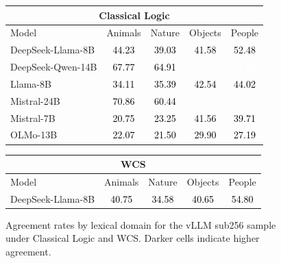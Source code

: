 \begin{figure}[H]
\centering
\caption{Agreement rates by lexical domain for the vLLM sub256 sample under Classical Logic and WCS. Darker cells indicate higher agreement.}
\label{fig:domain-heatmap-vllm}
\small
\begin{tabular}{lcccc}
\multicolumn{5}{c}{\textbf{Classical Logic}} \\
\toprule
Model & Animals & Nature & Objects & People \\
\midrule
DeepSeek-Llama-8B & \cellcolor[HTML]{A9C4B0}\textcolor{black}{44.23} & \cellcolor[HTML]{B3CAB9}\textcolor{black}{39.03} & \cellcolor[HTML]{ADC6B3}\textcolor{black}{41.58} & \cellcolor[HTML]{9AB9A1}\textcolor{black}{52.48} \\

DeepSeek-Qwen-14B & \cellcolor[HTML]{7AA385}\textcolor{black}{67.77} & \cellcolor[HTML]{80A78A}\textcolor{black}{64.91} & \cellcolor[HTML]{63936F}\textcolor{white}{79.62} & \cellcolor[HTML]{5F906B}\textcolor{white}{81.80} \\

Llama-8B & \cellcolor[HTML]{BDD1C2}\textcolor{black}{34.11} & \cellcolor[HTML]{BBD0C0}\textcolor{black}{35.39} & \cellcolor[HTML]{ABC5B2}\textcolor{black}{42.54} & \cellcolor[HTML]{A9C4B0}\textcolor{black}{44.02} \\

Mistral-24B & \cellcolor[HTML]{759F7F}\textcolor{black}{70.86} & \cellcolor[HTML]{8AAE93}\textcolor{black}{60.44} & \cellcolor[HTML]{679673}\textcolor{white}{77.71} & \cellcolor[HTML]{6B9876}\textcolor{white}{75.98} \\

Mistral-7B & \cellcolor[HTML]{D6E3D9}\textcolor{black}{20.75} & \cellcolor[HTML]{D2E0D6}\textcolor{black}{23.25} & \cellcolor[HTML]{ADC6B3}\textcolor{black}{41.56} & \cellcolor[HTML]{B1C9B7}\textcolor{black}{39.71} \\

OLMo-13B & \cellcolor[HTML]{D4E1D7}\textcolor{black}{22.07} & \cellcolor[HTML]{D4E1D7}\textcolor{black}{21.50} & \cellcolor[HTML]{C4D6C9}\textcolor{black}{29.90} & \cellcolor[HTML]{CADBCE}\textcolor{black}{27.19} \\

\bottomrule
\end{tabular}
\vspace{1.0em}
\begin{tabular}{lcccc}
\multicolumn{5}{c}{\textbf{WCS}} \\
\toprule
Model & Animals & Nature & Objects & People \\
\midrule
DeepSeek-Llama-8B & \cellcolor[HTML]{AFBBD4}\textcolor{black}{40.75} & \cellcolor[HTML]{BBC5DA}\textcolor{black}{34.58} & \cellcolor[HTML]{AFBBD4}\textcolor{black}{40.65} & \cellcolor[HTML]{94A3C5}\textcolor{black}{54.80} \\


\end{tabular}
\end{figure}
